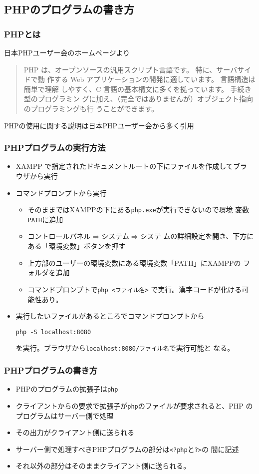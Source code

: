 \subsection{PHPのプログラムの書き方}
\begin{frame}[containsverbatim]
\frametitle{PHPとは}
日本PHPユーザー会のホームページより

\begin{quotation}
PHP は、オープンソースの汎用スクリプト言語です。 特に、サーバサイドで動
 作する Web アプリケーションの開発に適しています。 言語構造は簡単で理解
 しやすく、C 言語の基本構文に多くを拠っています。 手続き型のプログラミン
 グに加え、（完全ではありませんが）オブジェクト指向のプログラミングも行
 うことができます。
\end{quotation}
PHPの使用に関する説明は日本PHPユーザー会から多く引用
\end{frame}
\begin{frame}[containsverbatim]
 \frametitle{PHPプログラムの実行方法}
\begin{itemize}
 \item XAMPP で指定されたドキュメントルートの下にファイルを作成してブラ
       ウザから実行
 \item コマンドプロンプトから実行
       \begin{itemize}
        \item そのままではXAMPPの下にある\texttt{php.exe}が実行できないので環境
       変数\texttt{PATH}に追加
        \item コントロールパネル$\Rightarrow$システム$\Rightarrow$システ
              ムの詳細設定を開き、下方にある「環境変数」ボタンを押す
        \item 上方部のユーザーの環境変数にある環境変数「PATH」にXAMPPの
              フォルダを追加
        \item コマンドプロンプトで\Verb+php <ファイル名>+
              で実行。漢字コードが化ける可能性あり。
       \end{itemize}
 \item 実行したいファイルがあるところでコマンドプロンプトから

       \Verb+php -S localhost:8080+

       を実行。ブラウザから\Verb+localhost:8080/ファイル名+で実行可能と
       なる。

\end{itemize}
 \end{frame}
\begin{frame}[containsverbatim]
\frametitle{PHPプログラムの書き方}
\begin{itemize}
 \item PHPのプログラムの拡張子は\texttt{php}
 \item クライアントからの要求で拡張子が\texttt{php}のファイルが要求されると、PHP
のプログラムはサーバー側で処理
 \item その出力がクライアント側に送られる
 \item サーバー側で処理すべきPHPプログラムの部分は\texttt{<?php}と\texttt{?>}の
間に記述
 \item それ以外の部分はそのままクライアント側に送られる。
\end{itemize}
\end{frame}

